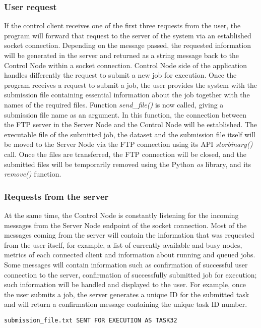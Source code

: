 \documentclass[10pt]{report}
\begin{document}
\subsubsection{User request}
If the control client receives one of the first three requests from the user, the program will forward that request to the server of the system via an established socket connection. Depending on the message passed, the requested information will be generated in the server and returned as a string message back to the Control Node within a socket connection. Control Node side of the application handles differently the request to submit a new job for execution. Once the program receives a request to submit a job, the user provides the system with the submission file containing essential information about the job together with the names of the required files. Function \textit{send\_file()} is now called, giving a submission file name as an argument. In this function, the connection between the FTP server in the Server Node and the Control Node will be established. The executable file of the submitted job, the dataset and the submission file itself will be moved to the Server Node via the FTP connection using its API \textit{storbinary()} call. Once the files are transferred, the FTP connection will be closed, and the submitted files will be temporarily removed using the Python \textit{os} library, and its \textit{remove()} function.

\subsubsection{Requests from the server}

At the same time, the Control Node is constantly listening for the incoming messages from the Server Node endpoint of the socket connection. Most of the messages coming from the server will contain the information that was requested from the user itself, for example, a list of currently available and busy nodes, metrics of each connected client and information about running and queued jobs. Some messages will contain information such as confirmation of successful user connection to the server, confirmation of successfully submitted job for execution; such information will be handled and displayed to the user. For example, once the user submits a job, the server generates a unique ID for the submitted task and will return a confirmation message containing the unique task ID number.

\begin{lstlisting}[style=DOS]
    submission_file.txt SENT FOR EXECUTION AS TASK32
\end{lstlisting}
\end{document}
